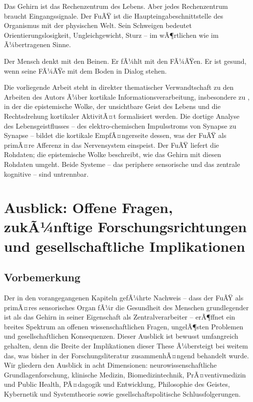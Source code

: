 ﻿\documentclass[12pt,a4paper]{report}
\theoremstyle{plain}
\theoremstyle{definition}
\theoremstyle{remark}
\begin{document}
Das Gehirn ist das Rechenzentrum des Lebens. Aber jedes Rechenzentrum
braucht Eingangssignale. Der FuÃŸ ist die Haupteingabeschnittstelle
des Organismus mit der physischen Welt. Sein Schweigen bedeutet
Orientierungslosigkeit, Ungleichgewicht, Sturz -- im wÃ¶rtlichen wie
im Ã¼bertragenen Sinne.

Der Mensch denkt mit den Beinen. Er fÃ¼hlt mit den FÃ¼ÃŸen. Er ist gesund,
wenn seine FÃ¼ÃŸe mit dem Boden in Dialog stehen.

Die vorliegende Arbeit steht in direkter thematischer Verwandtschaft
zu den Arbeiten des Autors Ã¼ber kortikale Informationsverarbeitung,
insbesondere zu \cite{epp2026brn}, in der die epistemische Wolke,
der unsichtbare Geist des Lebens und die Rechtsdrehung kortikaler
AktivitÃ¤t formalisiert werden. Die dortige Analyse des Lebensgeistflusses --
des elektro-chemischen Impulsstroms von Synapse zu Synapse -- bildet
die kortikale EmpfÃ¤ngerseite dessen, was der FuÃŸ als primÃ¤re Afferenz
in das Nervensystem einspeist. Der FuÃŸ liefert die Rohdaten;
die epistemische Wolke beschreibt, wie das Gehirn mit diesen Rohdaten
umgeht. Beide Systeme -- das periphere sensorische und das zentrale
kognitive -- sind untrennbar.

\chapter{Ausblick: Offene Fragen, zukÃ¼nftige Forschungsrichtungen\\
und gesellschaftliche Implikationen}

\section{Vorbemerkung}

Der in den vorangegangenen Kapiteln gefÃ¼hrte Nachweis -- dass der FuÃŸ
als primÃ¤res sensorisches Organ fÃ¼r die Gesundheit des Menschen
grundlegender ist als das Gehirn in seiner Eigenschaft als
Zentralverarbeiter -- erÃ¶ffnet ein breites Spektrum an offenen
wissenschaftlichen Fragen, ungelÃ¶sten Problemen und gesellschaftlichen
Konsequenzen. Dieser Ausblick ist bewusst umfangreich gehalten, denn
die Breite der Implikationen dieser These Ã¼bersteigt bei weitem das,
was bisher in der Forschungsliteratur zusammenhÃ¤ngend behandelt wurde.
Wir gliedern den Ausblick in acht Dimensionen: neurowissenschaftliche
Grundlagenforschung, klinische Medizin, Biomedizintechnik,
PrÃ¤ventivmedizin und Public Health, PÃ¤dagogik und Entwicklung,
Philosophie des Geistes, Kybernetik und Systemtheorie sowie
gesellschaftspolitische Schlussfolgerungen.
\end{document}
